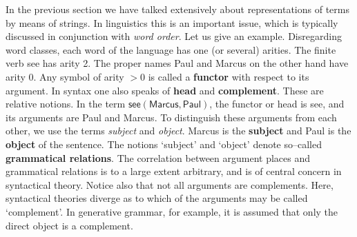 In the previous section we have talked extensively about representations 
of terms by means of strings. In linguistics this is an important 
issue, which is typically discussed in conjunction 
with {\it word order}. Let us give an example.  Disregarding
word classes, each word of the language has one (or several)
arities. The finite verb \textsf{see} has arity 2. The proper
names \textsf{Paul} and \textsf{Marcus} on the other hand have arity
0. Any symbol of arity $> 0$ is called a \textbf{functor} with
respect to its argument.
In syntax one also speaks of
\textbf{head} and \textbf{complement}. These are relative notions. In
the term $\textsf{see}(\textsf{Marcus},\textsf{Paul})$,
the functor or head is \textsf{see}, and its arguments are
\textsf{Paul} and \textsf{Marcus}. To distinguish these arguments from
each other, we use the terms {\it subject\/} and {\it object}.
\textsf{Marcus} is the \textbf{subject} and \textsf{Paul} is the 
\textbf{object} of the sentence. The notions `subject' and `object' 
denote so--called \textbf{grammatical relations}.
The correlation between argument places and grammatical relations
is to a large extent arbitrary, and is of central concern in
syntactical theory. Notice also that not all arguments are
complements. Here, syntactical theories diverge as to which of
the arguments may be called `complement'. In generative grammar,
for example, it is assumed that only the direct object is a
complement.

